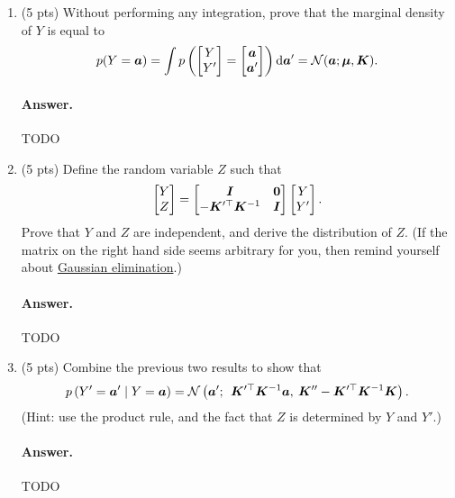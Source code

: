 \documentclass[11pt,letterpaper]{article}
\newenvironment{answer}{%
    \vspace{1em}
    \color{black}
    \paragraph{Answer.}
  }{%
    \vspace{1em}
  }
\begin{document}
\begin{enumerate}
  \item (5 pts) Without performing any integration, prove that the marginal density of $Y$ is equal to
  \begin{equation}
    p(Y = {\bm{a}})
    = \int p\left( \begin{bmatrix} Y \\ Y' \end{bmatrix} = \begin{bmatrix} {\bm{a}} \\ {\bm{a}}' \end{bmatrix} \right) \textrm{d} {\bm{a}}'
    = \mathcal{N}({\bm{a}}; {\bm{\mu}}, {\bm{K}}).
    \label{eqn:marginalization}
  \end{equation}

\begin{answer}
  TODO
\end{answer}

  \item (5 pts) Define the random variable $Z$ such that
    $$
      \begin{bmatrix}
        Y \\ Z
      \end{bmatrix}
      =
      \begin{bmatrix}
        {\bm{I}} & {\bm{0}} \\
        -{\bm{K}}^{\prime\top}{\bm{K}}^{-1} & {\bm{I}}
      \end{bmatrix}
      \begin{bmatrix} Y \\ Y' \end{bmatrix}.
    $$
    Prove that $Y$ and $Z$ are independent, and derive the distribution of $Z$.
    (If the matrix on the right hand side seems arbitrary for you, then remind yourself about \href{https://en.wikipedia.org/wiki/Gaussian_elimination}{Gaussian elimination}.)

\begin{answer}
  TODO
\end{answer}

  \item (5 pts) Combine the previous two results to show that
    \begin{equation}
      p\left( Y' = {\bm{a}}' \mid Y = {\bm{a}} \right) = \mathcal{N} \left(
        {\bm{a}}'; \:\: {\bm{K}}^{\prime\top} {\bm{K}}^{-1} {\bm{a}}, \: {\bm{K}}^{\prime\prime} - {\bm{K}}^{\prime\top} {\bm{K}}^{-1} {\bm{K}}
      \right).
      \label{eqn:conditioning}
    \end{equation}
    (Hint: use the product rule, and the fact that $Z$ is determined by $Y$ and $Y'$.)

\begin{answer}
  TODO
\end{answer}

\end{enumerate}
\end{document}
